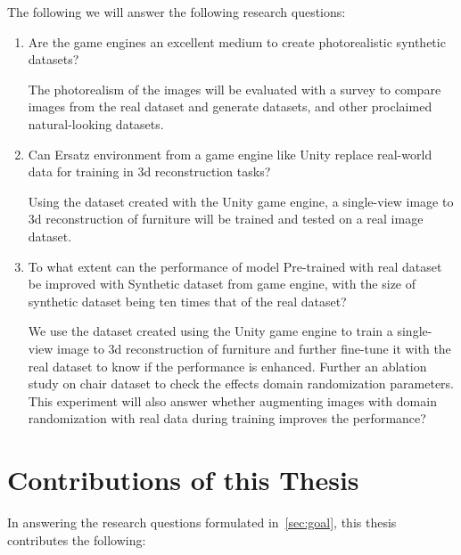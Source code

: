 The following we will answer the following research questions:
\begin{enumerate}
    \item Are the game engines an excellent medium to create photorealistic synthetic datasets?

    The photorealism of the images will be evaluated with a survey to compare images from the real dataset and generate datasets, and other proclaimed natural-looking datasets.

    \item Can Ersatz environment from a game engine like Unity replace real-world data for training in 3d reconstruction tasks?

    Using the dataset created with the Unity game engine, a single-view image to 3d reconstruction of furniture will be trained and tested on a real image dataset.

    \item To what extent can the performance of model Pre-trained with real dataset be improved with Synthetic dataset from game engine, with the size of synthetic dataset being ten times that of the real dataset?

    We use the dataset created using the Unity game engine to train a single-view image to 3d reconstruction of furniture and further fine-tune it with the real dataset to know if the performance is enhanced.
    Further an ablation study on chair dataset to check the effects domain randomization parameters.
    This experiment will also answer whether augmenting images with domain randomization with real data during training improves the performance?

\end{enumerate}

\section{Contributions of this Thesis}\label{sec:contributions}
In answering the research questions formulated in~\ref{sec:goal}, this thesis contributes the following:


